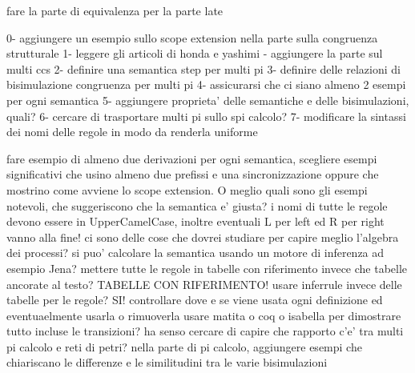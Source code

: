 
fare la parte di equivalenza per la parte late









0- aggiungere un esempio sullo scope extension nella parte sulla congruenza strutturale
1- leggere gli articoli di honda e yashimi
 - aggiungere la parte sul multi ccs
2- definire una semantica step per multi pi
3- definire delle relazioni di bisimulazione congruenza per multi pi
4- assicurarsi che ci siano almeno 2 esempi per ogni semantica
5- aggiungere proprieta' delle semantiche e delle bisimulazioni, quali?
6- cercare di trasportare multi pi sullo spi calcolo?
7- modificare la sintassi dei nomi delle regole in modo da renderla uniforme


fare esempio di almeno due derivazioni per ogni semantica, scegliere esempi significativi che usino almeno due prefissi e una sincronizzazione oppure che mostrino come avviene lo scope extension.
O meglio quali sono gli esempi notevoli, che suggeriscono che la semantica e' giusta?
i nomi di tutte le regole devono essere in UpperCamelCase, inoltre eventuali L per left ed R per right vanno alla fine!
ci sono delle cose che dovrei studiare per capire meglio l'algebra dei processi?
si puo' calcolare la semantica usando un motore di inferenza ad esempio Jena?
mettere tutte le regole in tabelle con riferimento invece che tabelle ancorate al testo? TABELLE CON RIFERIMENTO!
usare inferrule invece delle tabelle per le regole? SI!
controllare dove e se viene usata ogni definizione ed eventuaelmente usarla o rimuoverla
usare matita o coq o isabella per dimostrare tutto incluse le transizioni?
ha senso cercare di capire che rapporto c'e' tra multi pi calcolo e reti di petri?
nella parte di pi calcolo, aggiungere esempi che chiariscano le differenze e le similitudini tra le varie bisimulazioni



